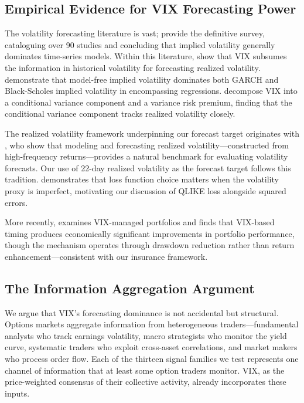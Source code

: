 \documentclass[12pt,a4paper]{article}
\begin{document}
\subsection{Empirical Evidence for VIX Forecasting Power}

The volatility forecasting literature is vast; \citet{poon2003} provide the definitive survey, cataloguing over 90 studies and concluding that implied volatility generally dominates time-series models. Within this literature, \citet{christensen1998} show that VIX subsumes the information in historical volatility for forecasting realized volatility. \citet{jiang2005} demonstrate that model-free implied volatility dominates both GARCH and Black-Scholes implied volatility in encompassing regressions. \citet{bekaert2014} decompose VIX into a conditional variance component and a variance risk premium, finding that the conditional variance component tracks realized volatility closely.

The realized volatility framework underpinning our forecast target originates with \citet{andersen2003}, who show that modeling and forecasting realized volatility---constructed from high-frequency returns---provides a natural benchmark for evaluating volatility forecasts. Our use of 22-day realized volatility as the forecast target follows this tradition. \citet{patton2011} demonstrates that loss function choice matters when the volatility proxy is imperfect, motivating our discussion of QLIKE loss alongside squared errors.

More recently, \citet{bozovic2024} examines VIX-managed portfolios and finds that VIX-based timing produces economically significant improvements in portfolio performance, though the mechanism operates through drawdown reduction rather than return enhancement---consistent with our insurance framework.

\subsection{The Information Aggregation Argument}

We argue that VIX's forecasting dominance is not accidental but structural. Options markets aggregate information from heterogeneous traders---fundamental analysts who track earnings volatility, macro strategists who monitor the yield curve, systematic traders who exploit cross-asset correlations, and market makers who process order flow. Each of the thirteen signal families we test represents one channel of information that at least some option traders monitor. VIX, as the price-weighted consensus of their collective activity, already incorporates these inputs.
\end{document}
